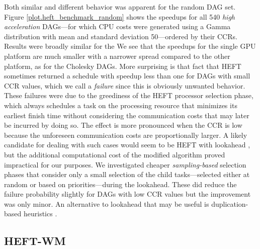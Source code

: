 \documentclass[runningheads]{llncs}
\begin{document}
Both similar and different behavior was apparent for the random DAG set. Figure \ref{plot.heft_benchmark_random} shows the speedups for all 540 {\em high acceleration} DAGs---for which CPU costs were generated using a Gamma distribution with mean and standard deviation 50---ordered by their CCRs. Results were broadly similar for the We see that the speedups for the single GPU platform are much smaller with a narrower spread compared to the other platform, as for the Cholesky DAGs. More surprising is that fact that HEFT sometimes returned a schedule with speedup less than one for DAGs with small CCR values, which we call a {\em failure} since this is obviously unwanted behavior. These failures were due to the greediness of the HEFT processor selection phase, which always schedules a task on the processing resource that minimizes its earliest finish time without considering the communication costs that may later be incurred by doing so. The effect is more pronounced when the CCR is low because the unforeseen communication costs are proportionally larger. A likely candidate for dealing with such cases would seem to be HEFT with lookahead \cite{bittencourt10}, but the additional computational cost of the modified algorithm proved impractical for our purposes. We investigated cheaper {\em sampling-based} selection phases that consider only a small selection of the child tasks---selected either at random or based on priorities---during the lookahead. These did reduce the failure probability slightly for DAGs with low CCR values but the improvement was only minor. An alternative to lookahead that may be useful is duplication-based heuristics \cite{duplication}.    



\subsection{HEFT-WM}
\label{subsect.heft_WM}
\end{document}
